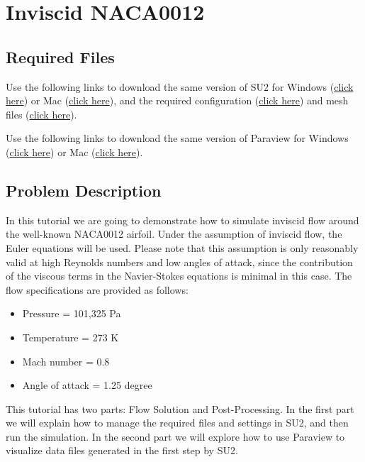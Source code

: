 \chapter{Inviscid NACA0012}
\label{ch:Inviscid NACA0012}
\section{Required Files}
\begin{su2note}
	Use the following links to download the same version of SU2 for Windows (\href{}{click here}) or Mac (\href{}{click here}), and the required configuration (\href{}{click here}) and mesh files (\href{}{click here}).
\end{su2note}
\begin{paraviewnote}
	Use the following links to download the same version of Paraview for Windows (\href{}{click here}) or Mac (\href{}{click here}).
\end{paraviewnote}

\section{Problem Description}
In this tutorial we are going to demonstrate how to simulate inviscid flow around the well-known NACA0012 airfoil. Under the assumption of inviscid flow, the Euler equations will be used. Please note that this assumption is only reasonably valid at high Reynolds numbers and low angles of attack, since the contribution of the viscous terms in the Navier-Stokes equations is minimal in this case. The flow specifications are provided as follows:
\begin{itemize}
    \item Pressure = 101,325 Pa
    \item Temperature = 273 K
    \item Mach number = 0.8
    \item Angle of attack = 1.25 degree
\end{itemize}
This tutorial has two parts: Flow Solution and Post-Processing. In the first part we will explain how to manage the required files and settings in SU2, and then run the simulation. In the second part we will explore how to use Paraview to visualize data files generated in the first step by SU2.
